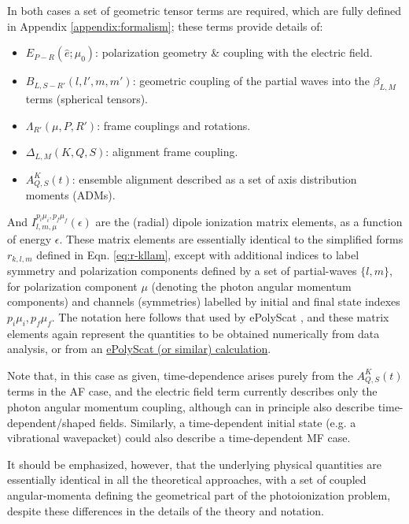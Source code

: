 \documentclass[10pt]{article}
\begin{document}
In both cases a set of geometric tensor terms are required, which are fully defined in Appendix \ref{appendix:formalism}; these terms provide details of:

\begin{itemize}
\item ${E_{P-R}(\hat{e};\mu_{0})}$: polarization geometry \& coupling with the electric field.
\item $B_{L,S-R'}(l,l',m,m')$: geometric coupling of the partial waves into the $\beta_{L,M}$ terms (spherical tensors).
\item $\Lambda_{R'}(\mu,P,R')$: frame couplings and rotations.
\item $\Delta_{L,M}(K,Q,S)$: alignment frame coupling.
\item $A_{Q,S}^{K}(t)$: ensemble alignment described as a set of axis distribution moments (ADMs).
\end{itemize}

And \(I_{l,m,\mu}^{p_{i}\mu_{i},p_{f}\mu_{f}}(\epsilon)\) are the (radial) dipole ionization matrix elements, as a function of energy \(\epsilon\). These matrix elements are essentially identical to the simplified forms $r_{k,l,m}$ defined in Eqn. \ref{eq:r-kllam}, except with additional indices to label symmetry and polarization components
defined by a set of partial-waves \(\{l,m\}\), for polarization component \(\mu\) (denoting the photon angular momentum components) and channels (symmetries) labelled by initial and final state indexes \({p_{i}\mu_{i},p_{f}\mu_{f}}\). The notation here follows that used by ePolyScat \cite{Gianturco1994, Lucchese1986, Natalense1999}, and these matrix elements again represent the quantities  to be obtained numerically from data analysis, or from an \href{https://epsproc.readthedocs.io/en/latest/ePS_ePSproc_tutorial/ePS_tutorial_080520.html\#Theoretical-background}{ePolyScat (or similar) calculation}. 

Note that, in this case as given, time-dependence arises purely from the \(A_{Q,S}^{K}(t)\) terms in the AF case, and the electric field term currently describes only the photon angular momentum coupling,
although can in principle also describe time-dependent/shaped fields. Similarly, a time-dependent initial state (e.g. a vibrational wavepacket) could also describe a time-dependent MF case.

It should be emphasized, however, that the underlying physical quantities are essentially identical in all the theoretical approaches, with a set of coupled angular-momenta defining the geometrical part of the photoionization problem, despite these differences in the details of the theory and notation. 
\end{document}
